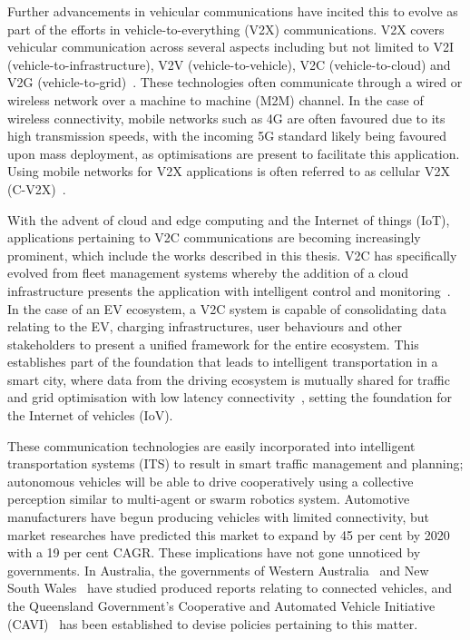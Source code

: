 Further advancements in vehicular communications have incited this to evolve as part of the efforts in vehicle-to-everything (V2X) communications. V2X covers vehicular communication across several aspects including but not limited to V2I (vehicle-to-infrastructure), V2V (vehicle-to-vehicle), V2C (vehicle-to-cloud) and V2G (vehicle-to-grid)~\cite{pearre_review_2019}. These technologies often communicate through a wired or wireless network over a machine to machine (M2M) channel. In the case of wireless connectivity, mobile networks such as 4G are often favoured due to its high transmission speeds, with the incoming 5G standard likely being favoured upon mass deployment, as optimisations are present to facilitate this application. Using mobile networks for V2X applications is often referred to as cellular V2X (C-V2X)~\cite{papathanassiou_cellular_2017}.

With the advent of cloud and edge computing and the Internet of things (IoT), applications pertaining to V2C communications are becoming increasingly prominent, which include the works described in this thesis. V2C has specifically evolved from fleet management systems whereby the addition of a cloud infrastructure presents the application with intelligent control and monitoring~\cite{deng_cooperative_2019}. In the case of an EV ecosystem, a V2C system is capable of consolidating data relating to the EV, charging infrastructures, user behaviours and other stakeholders to present a unified framework for the entire ecosystem. This establishes part of the foundation that leads to intelligent transportation in a smart city, where data from the driving ecosystem is mutually shared for traffic and grid optimisation with low latency connectivity~\cite{hensher_tackling_2018, khattak_toward_2019}, setting the foundation for the Internet of vehicles (IoV).

These communication technologies are easily incorporated into intelligent transportation systems (ITS) to result in smart traffic management and planning; autonomous vehicles will be able to drive cooperatively using a collective perception similar to multi-agent or swarm robotics system. Automotive manufacturers have begun producing vehicles with limited connectivity, but market researches have predicted this market to expand by 45 per cent by 2020 with a 19 per cent CAGR. These implications have not gone unnoticed by governments. In Australia, the governments of Western Australia~\cite{weeratunga_connected_2015} and New South Wales~\cite{transport_for_nsw_connected_2018} have studied produced reports relating to connected vehicles, and the Queensland Government's Cooperative and Automated Vehicle Initiative (CAVI)~\cite{queensland_government_cavi:_2017} has been established to devise policies pertaining to this matter. 


